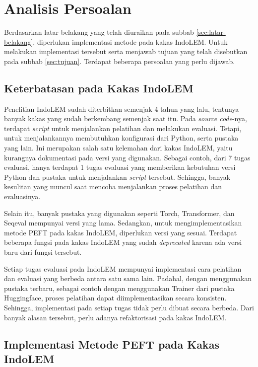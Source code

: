 \section{Analisis Persoalan}
\label{sec:analisis-persoalan}

Berdasarkan latar belakang yang telah diuraikan pada subbab \ref{sec:latar-belakang}, diperlukan implementasi metode \PEFT pada kakas IndoLEM. Untuk melakukan implementasi tersebut serta menjawab tujuan yang telah disebutkan pada subbab \ref{sec:tujuan}. Terdapat beberapa persoalan yang perlu dijawab.

\subsection{Keterbatasan pada Kakas IndoLEM}

Penelitian IndoLEM sudah diterbitkan semenjak 4 tahun yang lalu, tentunya banyak kakas yang sudah berkembang semenjak saat itu. Pada \textit{source code}-nya, terdapat \textit{script} untuk menjalankan pelatihan dan melakukan evaluasi. Tetapi, untuk menjalankannya membutuhkan konfigurasi dari Python, serta pustaka yang lain. Ini merupakan salah satu kelemahan dari kakas IndoLEM, yaitu kurangnya dokumentasi pada versi yang digunakan. Sebagai contoh, dari 7 tugas evaluasi, hanya terdapat 1 tugas evaluasi yang memberikan kebutuhan versi Python dan pustaka untuk menjalankan \textit{script} tersebut. Sehingga, banyak kesulitan yang muncul saat mencoba menjalankan proses pelatihan dan evaluasinya.

Selain itu, banyak pustaka yang digunakan seperti Torch, Transformer, dan Seqeval mempunyai versi yang lama. Sedangkan, untuk mengimplementasikan metode PEFT pada kakas IndoLEM, diperlukan versi yang sesuai. Terdapat beberapa fungsi pada kakas IndoLEM yang sudah \textit{deprecated} karena ada versi baru dari fungsi tersebut.

Setiap tugas evaluasi pada IndoLEM mempunyai implementasi cara pelatihan dan evaluasi yang berbeda antara satu sama lain. Padahal, dengan menggunakan pustaka terbaru, sebagai contoh dengan menggunakan Trainer dari pustaka Huggingface, proses pelatihan dapat diimplementasikan secara konsisten. Sehingga, implementasi pada setiap tugas tidak perlu dibuat secara berbeda. Dari banyak alasan tersebut, perlu adanya refaktorisasi pada kakas IndoLEM.

\subsection{Implementasi Metode PEFT pada Kakas IndoLEM}

